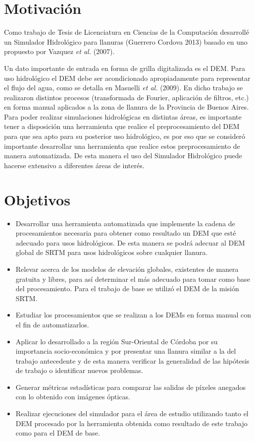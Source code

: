 \documentclass[10pt,a4paper, twoside]{report}
\begin{document}
\section{Motivación}

Como trabajo de Tesis de Licenciatura en Ciencias de la Computación desarrollé un Simulador Hidrológico para llanuras (Guerrero Cordova 2013) basado en uno propuesto por Vazquez \textit{et al.} (2007).

Un dato importante de entrada en forma de grilla digitalizada es el DEM. Para uso hidrológico el DEM debe ser acondicionado apropiadamente para representar el flujo del agua, como se detalla en Masuelli \textit{et al.} (2009). En dicho trabajo se realizaron distintos procesos (transformada de Fourier, aplicación de filtros, etc.) en forma manual aplicados a la zona de llanura de la Provincia de Buenos Aires. Para poder realizar simulaciones hidrológicas en distintas áreas, es importante tener a disposición una herramienta que realice el preprocesamiento del DEM para que sea apto para su posterior uso hidrológico, es por eso que se consideró importante desarrollar una herramienta que realice estos preprocesamiento de manera automatizada. De esta manera el uso del Simulador Hidrológico puede hacerse extensivo a diferentes áreas de interés.

\section{Objetivos}


\begin{itemize}
	\item Desarrollar una herramienta automatizada que implemente la cadena de procesamientos necesaria para obtener como resultado un DEM que esté adecuado para usos hidrológicos. De esta manera se podrá adecuar al DEM global de SRTM para usos hidrológicos sobre cualquier llanura.
	\item Relevar acerca de los modelos de elevación globales, existentes de manera gratuita y libres, para así determinar el más adecuado para tomar como base del procesamiento. Para el trabajo de base se utilizó el DEM de la misión SRTM.
	\item Estudiar los procesamientos que se realizan a los DEMs en forma manual con el fin de automatizarlos.
	\item Aplicar lo desarrollado a la región Sur-Oriental de Córdoba por su importancia socio-económica y por presentar una llanura similar a la del trabajo antecedente y de esta manera verificar la generalidad de las hipótesis de trabajo o identificar nuevos problemas.
	\item Generar métricas estadísticas para comparar las salidas de píxeles anegados con lo obtenido con imágenes ópticas.
	\item Realizar ejecuciones del simulador para el área de estudio utilizando tanto el DEM procesado por la herramienta obtenida como resultado de este trabajo como para el DEM de base.	
\end{itemize}
\end{document}
